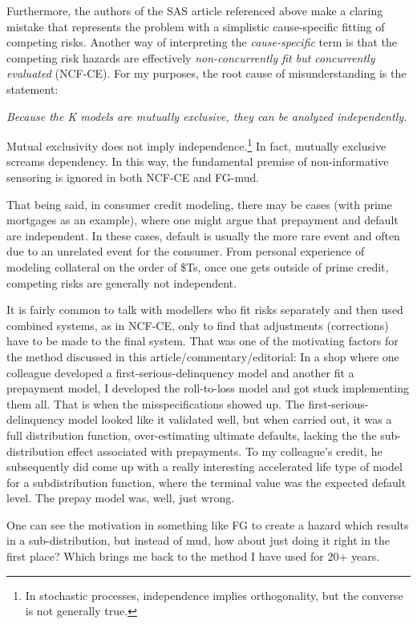 \documentclass[10pt]{article}
\begin{document}
Furthermore, the authors of the SAS article referenced above make a claring mistake that represents the problem with
a simplistic cause-specific fitting of competing risks.  Another way of interpreting the {\em cause-specific}
term is that the competing risk hazards are effectively {\em non-concurrently fit but 
concurrently evaluated} (NCF-CE).  For my purposes, the root cause of misunderstanding is the statement:
\begin{center}
\it Because the K models are mutually exclusive, they can be analyzed independently.
\end{center}
Mutual exclusivity does not imply independence.\footnote{In stochastic processes, independence implies 
orthogonality, but the converse is not generally true.}  In fact, mutually exclusive screams dependency.
In this way, the fundamental premise of 
non-informative sensoring is ignored in both NCF-CE and FG-mud.

That being said, in consumer credit modeling, there may be cases (with prime mortgages as an example), 
where one might argue that prepayment and default are independent. In these cases, default is usually 
the more rare event and often due to an unrelated event for the consumer. 
From personal experience of modeling collateral on the order of \$Ts,
once one gets outside of prime credit, competing risks are generally not independent.

It is fairly common to talk with modellers who fit risks separately and then used combined systems, as in NCF-CE,
only to find that adjustments (corrections) have to be made to the final system.  That was one of the motivating factors
for the method discussed in this article/commentary/editorial:  In a shop where one colleague developed a first-serious-delinquency model and
another fit a prepayment model, I developed the roll-to-loss model and got stuck implementing them all.  
That is when the misspecifications showed up.  The first-serious-delinquency model looked like it validated well, 
but when carried out, it was a full distribution function, over-estimating ultimate defaults, lacking
the the sub-distribution effect associated with prepayments.
To my colleague's credit, he subsequently did come up with a really interesting accelerated life type of model 
for a subdistribution function, where the terminal value was the expected default level.
The prepay model was, well, just wrong.

One can see the motivation in something like FG to create a hazard which results in a sub-distribution, 
but instead of mud, how about just doing it right in the first place?  
Which brings me back to the method I have used for 20+ years. 
\end{document}
